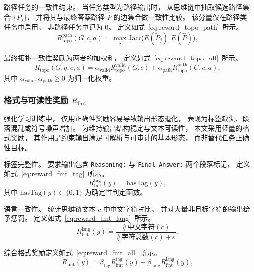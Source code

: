 {路径任务的一致性约束。}
当任务类型为路径输出时，
从思维链中抽取候选路径集合 $\{\tilde P_j\}$，
并将其与最终答案路径 $\hat P$ 的边集合做一致性比较。
该分量仅在路径类任务中启用，
非路径任务中记为 $0$。
定义如式~\ref{eq:reward_topo_path}\ 所示。
\begin{equation}
  R_{\mathrm{topo}}^{\mathrm{path}}(G,c,a)
  =
  \max_j
  \mathrm{Jacc}\big(E(\tilde{P}_j), E(\hat{P})\big),
  \label{eq:reward_topo_path}
\end{equation}

最终拓扑一致性奖励为两者的加权和，
定义如式~\ref{eq:reward_topo_all}\ 所示。
\begin{equation}
  R_{\mathrm{topo}}(G,q,c,a)
  =
  \alpha_{\mathrm{valid}} R_{\mathrm{topo}}^{\mathrm{valid}}(G,c)
  +
  \alpha_{\mathrm{path}} R_{\mathrm{topo}}^{\mathrm{path}}(G,c,a),
  \label{eq:reward_topo_all}
\end{equation}
其中 $\alpha_{\mathrm{valid}},\alpha_{\mathrm{path}} \ge 0$ 为归一化权重。

\subsubsection{格式与可读性奖励 $R_{\mathrm{fmt}}$}
\label{subsubsec:reward_fmt}

强化学习训练中，
仅用正确性奖励容易导致输出形态退化，
表现为标签缺失、段落混乱或符号噪声增加。
为维持输出结构稳定与文本可读性，
本文采用轻量的格式奖励，
其作用是约束输出满足可解析与可审计的基本形态，
而非替代任务正确性目标。

{标签完整性。}
要求输出包含 \texttt{Reasoning:} 与 \texttt{Final Answer:} 两个段落标记，
定义如式~\ref{eq:reward_fmt_tag}\ 所示。
\begin{equation}
  R_{\mathrm{fmt}}^{\mathrm{tag}}(y)
  =
  \mathrm{hasTag}(y),
  \label{eq:reward_fmt_tag}
\end{equation}
其中 $\mathrm{hasTag}(y)\in\{0,1\}$ 为确定性判定函数。

{语言一致性。}
统计思维链文本 $c$ 中中文字符占比，
并对大量非目标字符的输出给予惩罚。
定义如式~\ref{eq:reward_fmt_lang}\ 所示。
\begin{equation}
  R_{\mathrm{fmt}}^{\mathrm{lang}}(y)
  =
  \frac{\#\text{中文字符}(c)}{\#\text{字符总数}(c) + \varepsilon},
  \label{eq:reward_fmt_lang}
\end{equation}

综合格式奖励定义如式~\ref{eq:reward_fmt_all}\ 所示。
\begin{equation}
  R_{\mathrm{fmt}}(y)
  =
  \beta_{\mathrm{tag}} R_{\mathrm{fmt}}^{\mathrm{tag}}(y)
  +
  \beta_{\mathrm{lang}} R_{\mathrm{fmt}}^{\mathrm{lang}}(y),
  \label{eq:reward_fmt_all}
\end{equation}

